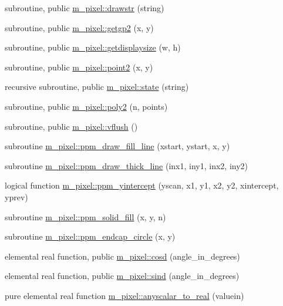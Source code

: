 \begin{DoxyCompactItemize}
subroutine, public \mbox{\hyperlink{namespacem__pixel_a6fa0c2d531d1ac74840aa2f0e2b050e0}{m\+\_\+pixel\+::drawstr}} (string)
\item 
subroutine, public \mbox{\hyperlink{namespacem__pixel_a626d769d3dae0c292e3ef1617ad43efb}{m\+\_\+pixel\+::getgp2}} (x, y)
\item 
subroutine, public \mbox{\hyperlink{namespacem__pixel_acacbc4462423b9aa0f591cbe7aba4ec6}{m\+\_\+pixel\+::getdisplaysize}} (w, h)
\item 
subroutine, public \mbox{\hyperlink{namespacem__pixel_a11234e0b33104eb0afb24f928b072053}{m\+\_\+pixel\+::point2}} (x, y)
\item 
recursive subroutine, public \mbox{\hyperlink{namespacem__pixel_aa24c465b23b0ddda341e97bc206fe249}{m\+\_\+pixel\+::state}} (string)
\item 
subroutine, public \mbox{\hyperlink{namespacem__pixel_a996117d631dce0e92056a0c486be5109}{m\+\_\+pixel\+::poly2}} (n, points)
\item 
subroutine, public \mbox{\hyperlink{namespacem__pixel_ae74cf11194379dbf13069a61b06589a2}{m\+\_\+pixel\+::vflush}} ()
\item 
subroutine \mbox{\hyperlink{namespacem__pixel_a6f75bc951acd07267e0841ca5985d8b7}{m\+\_\+pixel\+::ppm\+\_\+draw\+\_\+fill\+\_\+line}} (xstart, ystart, x, y)
\item 
subroutine \mbox{\hyperlink{namespacem__pixel_a1629b7134d0ea4b0f301ca23df764b8e}{m\+\_\+pixel\+::ppm\+\_\+draw\+\_\+thick\+\_\+line}} (inx1, iny1, inx2, iny2)
\item 
logical function \mbox{\hyperlink{namespacem__pixel_a4924b3a5033acb74a4f4df60a4ba21eb}{m\+\_\+pixel\+::ppm\+\_\+yintercept}} (yscan, x1, y1, x2, y2, xintercept, yprev)
\item 
subroutine \mbox{\hyperlink{namespacem__pixel_aedaf33a27e9899da22c2497aff2af903}{m\+\_\+pixel\+::ppm\+\_\+solid\+\_\+fill}} (x, y, n)
\item 
subroutine \mbox{\hyperlink{namespacem__pixel_aede24c612504a3e416840e6242c2d8fb}{m\+\_\+pixel\+::ppm\+\_\+endcap\+\_\+circle}} (x, y)
\item 
elemental real function, public \mbox{\hyperlink{namespacem__pixel_a312c40bfbd03b2bbe6f85bc5efca6ce3}{m\+\_\+pixel\+::cosd}} (angle\+\_\+in\+\_\+degrees)
\item 
elemental real function, public \mbox{\hyperlink{namespacem__pixel_a3ef23ce0230c47b30cb627ebd439daae}{m\+\_\+pixel\+::sind}} (angle\+\_\+in\+\_\+degrees)
\item 
pure elemental real function \mbox{\hyperlink{namespacem__pixel_a79feab3c00d124d3f3396ad87ed4940e}{m\+\_\+pixel\+::anyscalar\+\_\+to\+\_\+real}} (valuein)

\end{DoxyCompactItemize}

